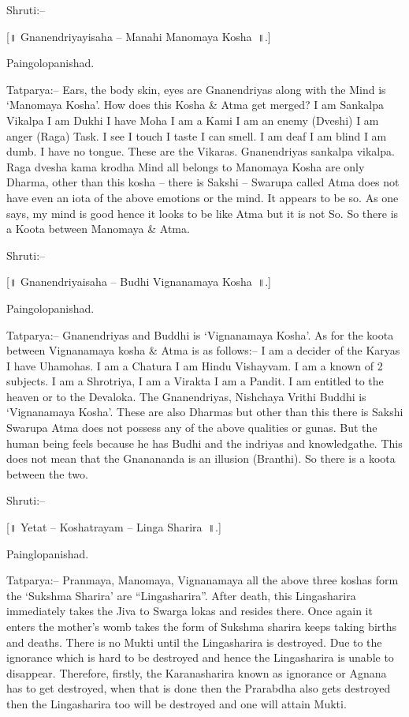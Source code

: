 Shruti:–

[॥ Gnanendriyayisaha – Manahi Manomaya Kosha~॥.]

Paingolopanishad.

Tatparya:– Ears, the body skin, eyes are Gnanendriyas along with the Mind is ‘Manomaya Kosha’. How does this Kosha \& Atma get merged? I am Sankalpa Vikalpa I am Dukhi I have Moha I am a Kami I am an enemy (Dveshi) I am anger (Raga) Task. I see I touch I taste I can smell. I am deaf I am blind I am dumb. I have no tongue. These are the Vikaras. Gnanendriyas sankalpa vikalpa. Raga dvesha kama krodha Mind all belongs to Manomaya Kosha are only Dharma, other than this kosha – there is Sakshi – Swarupa called Atma does not have even an iota of the above emotions or the mind. It appears to be so. As one says, my mind is good hence it looks to be like Atma but it is not So. So there is a Koota between Manomaya \& Atma.

Shruti:–

[॥ Gnanendriyaisaha – Budhi Vignanamaya Kosha~॥.]

Paingolopanishad.

Tatparya:– Gnanendriyas and Buddhi is ‘Vignanamaya Kosha’. As for the koota between Vignanamaya kosha \& Atma is as follows:– I am a decider of the Karyas I have Uhamohas. I am a Chatura I am Hindu Vishayvam. I am a known of 2 subjects. I am a Shrotriya, I am a Virakta I am a Pandit. I am entitled to the heaven or to the Devaloka. The Gnanendriyas, Nishchaya Vrithi Buddhi is ‘Vignanamaya Kosha’. These are also Dharmas but other than this there is Sakshi Swarupa Atma does not possess any of the above qualities or gunas. But the human being feels because he has Budhi and the indriyas and knowledgathe. This does not mean that the Gnanananda is an illusion (Branthi). So there is a koota between the two.

Shruti:–

[॥ Yetat – Koshatrayam – Linga Sharira~॥.]

Painglopanishad.

Tatparya:– Pranmaya, Manomaya, Vignanamaya all the above three koshas form the ‘Sukshma Sharira’ are “Lingasharira”. After death, this Lingasharira immediately takes the Jiva to Swarga lokas and resides there. Once again it enters the mother's womb takes the form of Sukshma sharira keeps taking births and deaths. There is no Mukti until the Lingasharira is destroyed. Due to the ignorance which is hard to be destroyed and hence the Lingasharira is unable to disappear. Therefore, firstly, the Karanasharira known as ignorance or Agnana has to get destroyed, when that is done then the Prarabdha also gets destroyed then the Lingasharira too will be destroyed and one will attain Mukti.

